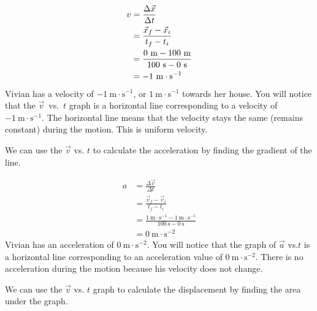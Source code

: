     \begin{align*}
    v &= \frac{\Delta \vec{x}}{\Delta t}\hfill \\ 
      &= \frac{\vec{x}_{f}-\vec{x}_{i}}{{t}_{f}-{t}_{i}}\\ 
      &= \frac{0~\text{m}-100~\text{m}}{100~\text{s}-0~\text{s}}\hfill \\ 
      &= -1~\text{m}\ensuremath{\cdot}{\text{s}}^{-1}
      \end{align*}
        \label{m38795*id70472}Vivian has a velocity of $-1~\text{m}\ensuremath{\cdot}\text{s}{}^{-1}$, or $1~\text{m}\ensuremath{\cdot}\text{s}{}^{-1}$ towards her house. You will notice that the $\vec{v}$~vs.~$t$ graph is a horizontal line corresponding to a velocity of $-1~\text{m}\ensuremath{\cdot}\text{s}{}^{-1}$. The horizontal line means that the velocity stays the same (remains constant) during the motion. This is uniform velocity.\par 
        \label{m38795*id70573}We can use the $\vec{v}$ vs. $t$ to calculate the acceleration by finding the gradient of the line.\par 
        \label{m38795*id70595}\nopagebreak\noindent{}
          
    \begin{align*}
      a&= \frac{\Delta \vec{v}}{\Delta t}\\ 
      &= \frac{\vec{v}_{f}-\vec{v}_{i}}{{t}_{f}-{t}_{i}}\\ 
      &= \frac{1~\text{m}\ensuremath{\cdot}{\text{s}}^{-1}-1~\text{m}\ensuremath{\cdot}{\text{s}}^{-1}}{100~\text{s}-0~\text{s}}\\ 
      &= 0~\text{m}\ensuremath{\cdot}{\text{s}}^{-2}
      \end{align*}
        \label{m38795*id70807}Vivian has an acceleration of $0~\text{m}\ensuremath{\cdot}\text{s}{}^{-2}$. You will notice that the graph of $\vec{a}$ vs.$t$ is a horizontal line corresponding to an acceleration value of $0~\text{m}\ensuremath{\cdot}\text{s}{}^{-2}$. There is no acceleration during the motion because his velocity does not change.\par 
        \label{m38795*id70880}We can use the $\vec{v}$ vs. $t$ graph to calculate the displacement by finding the area under the graph.
          
